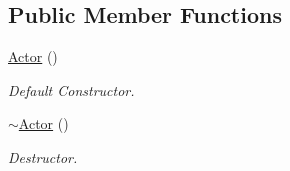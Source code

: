 \subsection*{Public Member Functions}
\begin{DoxyCompactItemize}
\item 
\hypertarget{classContent_1_1Actor_1_1Physics_1_1Actor_a024395bc19140e8f9569f2089d1526b4}{
\hyperlink{classContent_1_1Actor_1_1Physics_1_1Actor_a024395bc19140e8f9569f2089d1526b4}{Actor} ()}
\label{classContent_1_1Actor_1_1Physics_1_1Actor_a024395bc19140e8f9569f2089d1526b4}

\begin{DoxyCompactList}\small\item\em Default Constructor. \item\end{DoxyCompactList}\item 
\hypertarget{classContent_1_1Actor_1_1Physics_1_1Actor_a922fc01206d2b66d9b285ad865863e51}{
\hyperlink{classContent_1_1Actor_1_1Physics_1_1Actor_a922fc01206d2b66d9b285ad865863e51}{$\sim$Actor} ()}
\label{classContent_1_1Actor_1_1Physics_1_1Actor_a922fc01206d2b66d9b285ad865863e51}

\begin{DoxyCompactList}\small\item\em Destructor. \item\end{DoxyCompactList}\end{DoxyCompactItemize}

